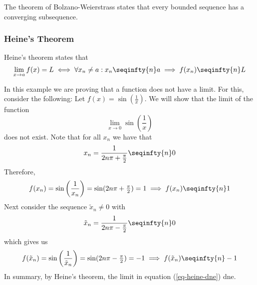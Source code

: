 \begin{thm}\label{thm-bolzano-weierstrass}
	The theorem of Bolzano-Weierstrass states that every bounded sequence has a
	converging subsequence.
\end{thm}

\subsubsection{Heine's Theorem}\label{subsubsec-heines-theorem}

\begin{thm}\label{thm-heines-theorem}
	Heine's theorem states that
	\begin{equation*}
		\lim_{x\to a}f(x)=L \iff \forall x_n\neq a: x_n \seqinfty{n} a \implies f(x_n) \seqinfty{n} L
	\end{equation*}
\end{thm}

\begin{exm}\label{exm-heine:1}
	In this example we are proving that a function does not have a limit. For this,
	consider the following: Let $f(x)=\sin\left(\tfrac{1}{x}\right)$. We will show
	that the limit of the function
	\begin{equation}\label{eq-heine-dne}
		\lim_{x\to0}\sin\left(\frac{1}{x}\right)
	\end{equation}
	does not exist. Note that for all $x_n$ we have that
	\begin{equation*}
		x_n=\frac{1}{2n\pi+\tfrac{\pi}{2}} \seqinfty{n} 0
	\end{equation*}
	Therefore,
	\begin{equation*}
		f(x_n)=\sin\left(\frac{1}{x_n}\right)=\sin(2n\pi+\tfrac{\pi}{2})=1
		\implies f(x_n) \seqinfty{n} 1
	\end{equation*}
	Next consider the sequence $\tilde{x}_n\neq0$ with
	\begin{equation*}
		\tilde{x}_n=\frac{1}{2n\pi-\tfrac{\pi}{2}} \seqinfty{n} 0
	\end{equation*}
	which gives us
	\begin{equation*}
		f(\tilde{x}_n)=\sin\left(\frac{1}{\tilde{x}_n}\right)=\sin(2n\pi-\tfrac{\pi}{2})=-1
		\implies f(\tilde{x}_n) \seqinfty{n} -1
	\end{equation*}
	In summary, by Heine's theorem, the limit in equation (\ref{eq-heine-dne}) \gls{dne}.
\end{exm}

